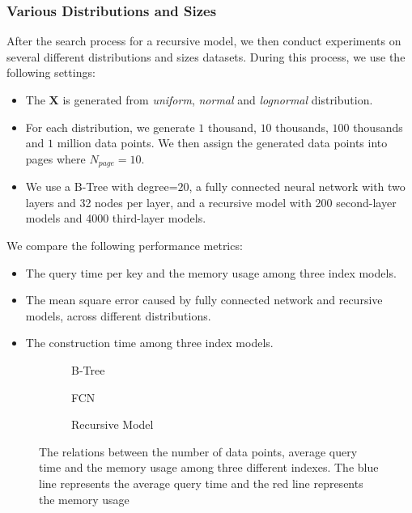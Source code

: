 \subsubsection{Various Distributions and Sizes}

After the search process for a recursive model, we then conduct experiments on several different distributions and sizes datasets. During this process, we use the following settings:

\begin{itemize}
	\item The $\boldsymbol{X}$ is generated from \textit{uniform}, \textit{normal} and \textit{lognormal} distribution.
	\item For each distribution, we generate $1$ thousand, $10$ thousands, $100$ thousands and $1$ million data points. We then assign the generated data points into pages where $N_{page}=10$.
	\item We use a B-Tree with degree=$20$, a fully connected neural network with two layers and 32 nodes per layer, and a recursive model with 200 second-layer models and 4000 third-layer models.
\end{itemize}

We compare the following performance metrics:

\begin{itemize}
	\item The query time per key and the memory usage among three index models.
	\item The mean square error caused by fully connected network and recursive models, across different distributions.
	\item The construction time among three index models.
\end{itemize}

\begin{figure}
 \centering
     \begin{subfigure}[b]{0.28\textwidth}
         \centering
         
         \caption{B-Tree}
         \label{fig:exp2_1_btree}
     \end{subfigure}
     \hfill
     \begin{subfigure}[b]{0.28\textwidth}
         \centering
         
         \caption{FCN}
         \label{fig:exp2_1_fcn}
     \end{subfigure}
     \hfill
     \begin{subfigure}[b]{0.28\textwidth}
         \centering
         
         \caption{Recursive Model}
         \label{fig:exp2_1_rmi}
     \end{subfigure}
        \caption{The relations between the number of data points, average query time and the memory usage among three different indexes. The blue line represents the average query time and the red line represents the memory usage}
        \label{fig:exp2_1}
\end{figure}

